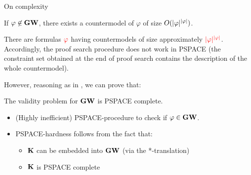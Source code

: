 \begin{frame}{On complexity}
\small
\begin{theorem}
If $\varphi\not\in\mathbf{GW}$,  there exists a countermodel of $\varphi$ of size  $O(|\varphi|^{|\varphi|})$.
  \end{theorem}

  \medskip
  There are formulas $\color{red} \varphi$ having countermodels of size approximately  $\color{red} |\varphi|^{|\varphi|}$.
  Accordingly,  the proof search procedure does not work in PSPACE (the constraint set
   obtained at the end of proof search contains the description of the {\red whole} countermodel).
  
  

\MP  
  However, reasoning as in   , we can prove that:

  \begin{theorem}
  The validity problem for $\mathbf{GW}$ is PSPACE complete. 
  \end{theorem}

  
  \begin{itemize}
    \medfont
  \item (Highly inefficient)  PSPACE-procedure to check if $\varphi\in\mathbf{GW}$.

  \item PSPACE-hardness follows from the fact that:
    \begin{itemize}\medfont
    \item[$\surd$]    $\mathbf{K}$ can be embedded into $\mathbf{GW}$ (via the *-translation)

\item[$\surd$]  $\mathbf{K}$ is PSPACE complete
    \end{itemize}


  \end{itemize}



\end{frame}









